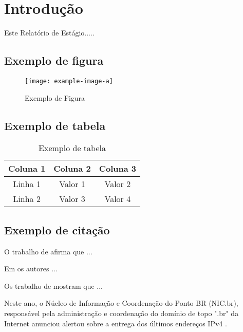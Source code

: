 \chapter{Introdução}
\label{cap:introducao}

Este Relatório de Estágio.....

\section{Exemplo de figura}

\begin{figure}[ht]
	\centering
	\caption{Exemplo de Figura}
	\texttt{[image: example-image-a]}
\end{figure}


\section{Exemplo de tabela}

\begin{table}[ht]
	\centering
	\caption{Exemplo de tabela}
	\label{tab:exemplo}
	\begin{tabular}{|c|c|c|}
		\hline
		\textbf{Coluna 1} & \textbf{Coluna 2} & \textbf{Coluna 3} \\ \hline
		Linha 1 & Valor 1 & Valor 2 \\ \hline
		Linha 2 & Valor 3 & Valor 4 \\ \hline
	\end{tabular}
\end{table}

\section{Exemplo de citação}

O trabalho de \cite{spanhol2015dataset} afirma que ...

Em \cite{engel2013relay} os autores ...

Os trabalho de \cite{huff2020building,scheffel2021automated} mostram que ...

Neste ano, o Núcleo de Informação e Coordenação do Ponto BR (NIC.br), responsável pela administração e coordenação do domínio de topo ".br" da Internet anunciou alertou sobre a entrega dos últimos endereços IPv4 \cite{nicbr2023IANA}.